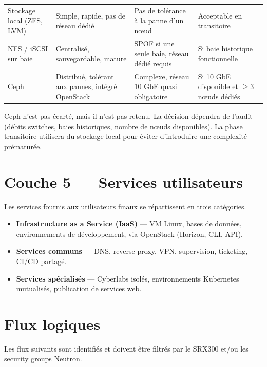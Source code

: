 {\small
\renewcommand{\arraystretch}{1.2}
\begin{xltabular}{\textwidth}{@{}lXXl@{}}
\toprule
{} &  &  &  \\
\midrule
\endhead
\bottomrule
\endfoot
\bottomrule
\endlastfoot
Stockage local (ZFS, LVM) & Simple, rapide, pas de réseau dédié & Pas de tolérance à la panne d'un nœud & Acceptable en transitoire \\
NFS / iSCSI sur baie & Centralisé, sauvegardable, mature & SPOF si une seule baie, réseau dédié requis & Si baie historique fonctionnelle \\
Ceph & Distribué, tolérant aux pannes, intégré OpenStack & Complexe, réseau 10 GbE quasi obligatoire & Si 10 GbE disponible et $\geq 3$ nœuds dédiés \\

\end{xltabular}
}

\begin{warnbox}
Ceph n'est pas écarté, mais il n'est pas retenu. La décision dépendra de l'audit (débits switches, baies historiques, nombre de nœuds disponibles). La phase transitoire utilisera du stockage local pour éviter d'introduire une complexité prématurée.
\end{warnbox}

\section{Couche 5 — Services utilisateurs}
Les services fournis aux utilisateurs finaux se répartissent en trois catégories.

\begin{itemize}
  \item \textbf{Infrastructure as a Service (IaaS)} — VM Linux, bases de données, environnements de développement, via OpenStack (Horizon, CLI, API).
  \item \textbf{Services communs} — DNS, reverse proxy, VPN, supervision, ticketing, CI/CD partagé.
  \item \textbf{Services spécialisés} — Cyberlabs isolés, environnements Kubernetes mutualisés, publication de services web.
\end{itemize}

\section{Flux logiques}
Les flux suivants sont identifiés et doivent être filtrés par le SRX300 et/ou les security groups Neutron.

